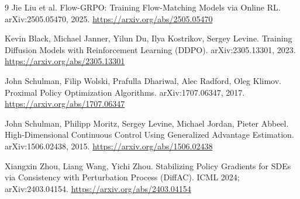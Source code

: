 \documentclass[11pt]{article}
\theoremstyle{plain}
\theoremstyle{remark}
\begin{document}
\begin{thebibliography}{9}
Jie Liu et al.
\newblock Flow-GRPO: Training Flow-Matching Models via Online RL.
\newblock arXiv:2505.05470, 2025. \url{https://arxiv.org/abs/2505.05470}

Kevin Black, Michael Janner, Yilun Du, Ilya Kostrikov, Sergey Levine.
\newblock Training Diffusion Models with Reinforcement Learning (DDPO).
\newblock arXiv:2305.13301, 2023. \url{https://arxiv.org/abs/2305.13301}

John Schulman, Filip Wolski, Prafulla Dhariwal, Alec Radford, Oleg Klimov.
\newblock Proximal Policy Optimization Algorithms.
\newblock arXiv:1707.06347, 2017. \url{https://arxiv.org/abs/1707.06347}

John Schulman, Philipp Moritz, Sergey Levine, Michael Jordan, Pieter Abbeel.
\newblock High-Dimensional Continuous Control Using Generalized Advantage Estimation.
\newblock arXiv:1506.02438, 2015. \url{https://arxiv.org/abs/1506.02438}

Xiangxin Zhou, Liang Wang, Yichi Zhou.
\newblock Stabilizing Policy Gradients for SDEs via Consistency with Perturbation Process (DiffAC).
\newblock ICML 2024; arXiv:2403.04154. \url{https://arxiv.org/abs/2403.04154}
\end{thebibliography}
\end{document}
